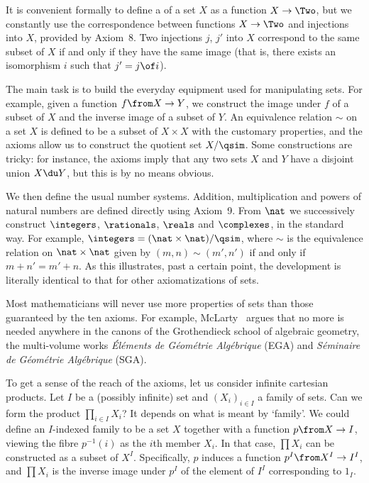 \documentclass[12pt]{article}
\begin{document}
It is convenient formally to define a  of a set $X$ as a
function $X \to \Two$, but we constantly use the correspondence between
functions $X \to \Two$ and injections into $X$, provided by Axiom~8.  Two
injections $j$, $j'$ into $X$ correspond to the same subset of $X$ if and
only if they have the same image (that is, there exists an isomorphism $i$
such that $j' = j \of i$).

The main task is to build the everyday equipment used for manipulating
sets.  For example, given a function $f\from X \to Y$, we construct the
image under $f$ of a subset of $X$ and the inverse image of a subset of
$Y$.  An equivalence relation $\sim$ on a set $X$ is defined to be a subset
of $X \times X$ with the customary properties, and the axioms allow us to
construct the quotient set $X/\qsim$.  Some constructions are tricky: for
instance, the axioms imply that any two sets $X$ and $Y$ have a disjoint
union $X \du Y$, but this is by no means obvious.

We then define the usual number systems.  Addition, multiplication and
powers of natural numbers are defined directly using Axiom~9.  From $\nat$
we successively construct $\integers$, $\rationals$, $\reals$ and
$\complexes$, in the standard way.  For example, $\integers = (\nat \times
\nat)/\qsim$, where $\sim$ is the equivalence relation on $\nat \times
\nat$ given by $(m, n) \sim (m', n')$ if and only if $m + n' = m' + n$.  As
this illustrates, past a certain point, the development is literally
identical to that for other axiomatizations of sets.



Most mathematicians will never use more properties of sets than those
guaranteed by the ten axioms.  For example, McLarty~\cite{McLaFOA} argues
that no more is needed anywhere in the canons of the Grothendieck school of
algebraic geometry, the multi-volume works \emph{\'El\'ements de
G\'eom\'etrie Alg\'ebrique} (EGA) and \emph{S\'eminaire de G\'eom\'etrie
Alg\'ebrique} (SGA).

To get a sense of the reach of the axioms, let us consider infinite
cartesian products.  Let $I$ be a (possibly infinite) set and $(X_i)_{i \in
  I}$ a family of sets.  Can we form the product $\prod_{i \in I} X_i$?
It depends on what is meant by `family'.  We could define an
$I$-indexed family to be a set $X$ together with a function $p\from X \to
I$, viewing the fibre $p^{-1}(i)$ as the $i$th member $X_i$.  In that case,
$\prod X_i$ can be constructed as a subset of $X^I$.  Specifically, $p$
induces a function $p^I \from X^I \to I^I$, and $\prod X_i$ is the inverse
image under $p^I$ of the element of $I^I$ corresponding to $1_I$.
\end{document}

